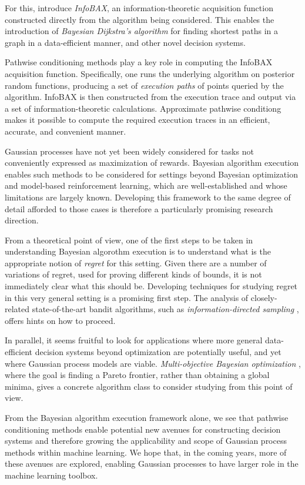\documentclass[11pt]{book}
\begin{document}
For this, \textcite{neiswanger21} introduce \emph{InfoBAX}, an information-theoretic acquisition function constructed directly from the algorithm being considered.
This enables the introduction of \emph{Bayesian Dijkstra's algorithm} for finding shortest paths in a graph in a data-efficient manner, and other novel decision systems.

Pathwise conditioning methods play a key role in computing the InfoBAX acquisition function.
Specifically, one runs the underlying algorithm on posterior random functions, producing a set of \emph{execution paths} of points queried by the algorithm.
InfoBAX is then constructed from the execution trace and output via a set of information-theoretic calculations.
Approximate pathwise conditiong makes it possible to compute the required execution traces in an efficient, accurate, and convenient manner.

Gaussian processes have not yet been widely considered for tasks not conveniently expressed as maximization of rewards.
Bayesian algorithm execution enables such methods to be considered for settings beyond Bayesian optimization and model-based reinforcement learning, which are well-established and whose limitations are largely known.
Developing this framework to the same degree of detail afforded to those cases is therefore a particularly promising research direction.

From a theoretical point of view, one of the first steps to be taken in understanding Bayesian algorothm execution is to understand what is the appropriate notion of \emph{regret} for this setting.
Given there are a number of variations of regret, used for proving different kinds of bounds, it is not immediately clear what this should be.
Developing techniques for studying regret in this very general setting is a promising first step.
The analysis of closely-related state-of-the-art bandit algorithms, such as \emph{information-directed sampling} \cite{russo14}, offers hints on how to proceed.

In parallel, it seems fruitful to look for applications where more general data-efficient decision systems beyond optimization are potentially useful, and yet where Gaussian process models are viable. 
\emph{Multi-objective Bayesian optimization} \cite{emmerich05,campigotto14,hernandezlobato16,suzuki20}, where the goal is finding a Pareto frontier, rather than obtaining a global minima, gives a concrete algorithm class to consider studying from this point of view.

From the Bayesian algorithm execution framework alone, we see that pathwise conditioning methods enable potential new avenues for constructing decision systems and therefore growing the applicability and scope of Gaussian process methods within machine learning.
We hope that, in the coming years, more of these avenues are explored, enabling Gaussian processes to have larger role in the machine learning toolbox.
\end{document}
